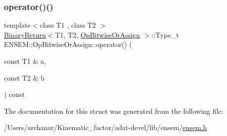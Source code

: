 \subsubsection{\texorpdfstring{operator()()}{operator()()}\hspace{0.1cm}{\footnotesize\ttfamily [3/3]}}
{\footnotesize\ttfamily template$<$class T1 , class T2 $>$ \\
\mbox{\hyperlink{structENSEM_1_1BinaryReturn}{Binary\+Return}}$<$T1, T2, \mbox{\hyperlink{structENSEM_1_1OpBitwiseOrAssign}{Op\+Bitwise\+Or\+Assign}} $>$\+::Type\+\_\+t E\+N\+S\+E\+M\+::\+Op\+Bitwise\+Or\+Assign\+::operator() (\begin{DoxyParamCaption}\item[{const T1 \&}]{a,  }\item[{const T2 \&}]{b }\end{DoxyParamCaption}) const\hspace{0.3cm}{\ttfamily [inline]}}



The documentation for this struct was generated from the following file\+:\begin{DoxyCompactItemize}
\item 
/\+Users/archanar/\+Kinematic\+\_\+factor/adat-\/devel/lib/ensem/\mbox{\hyperlink{adat-devel_2lib_2ensem_2ensem_8h}{ensem.\+h}}\end{DoxyCompactItemize}
